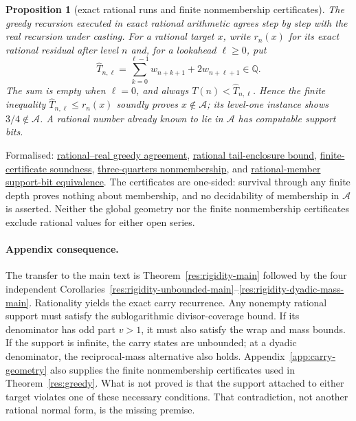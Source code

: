 \documentclass[11pt]{article}
\newcommand{\commit}{99f4bf47422abbd8757cbb22b50ba079d764d3a7}
\newcommand{\repobase}{https://github.com/wcook04/plectis-erdos/blob/\commit}
\newcommand{\PK}{Erdos249257}
\newcommand{\lword}[4]{\href{\repobase/\PK/#1\#L#2}{#4}}
\newtheorem{proposition}[theorem]{Proposition}
\theoremstyle{definition}
\theoremstyle{remark}
\newcommand{\Q}{\mathbb{Q}}
\begin{document}
\begin{proposition}[exact rational runs and finite nonmembership certificates]\label{res:death}
The greedy recursion executed in exact rational arithmetic agrees step by step
with the real recursion under casting. For a rational target $x$, write
$r_n(x)$ for its exact rational residual after level $n$ and, for a lookahead
$\ell\ge0$, put
\[
\widehat T_{n,\ell}
  =\sum_{k=0}^{\ell-1}w_{n+k+1}+2w_{n+\ell+1}\in\Q .
\]
The sum is empty when $\ell=0$, and always
$T(n)<\widehat T_{n,\ell}$. Hence the finite inequality
$\widehat T_{n,\ell}\le r_n(x)$ soundly proves $x\notin\mathcal A$; its
level-one instance shows $3/4\notin\mathcal A$. A rational number already
known to lie in $\mathcal A$ has computable support bits.
\end{proposition}
\noindent Formalised:
\lword{GreedyAchievementSet.lean}{1143}{cast_greedyMersenneRemainderRat}{rational--real greedy agreement},
\lword{GreedyAchievementSet.lean}{1728}{mersenneTail_lt_cast_tailUpperRat}{rational tail-enclosure bound},
\lword{GreedyAchievementSet.lean}{1762}{certifiedGreedyMersenneDeath_not_mem}{finite-certificate soundness},
\lword{GreedyAchievementSet.lean}{1784}{three_fourths_not_mem_mersenneAchievementSet}{three-quarters nonmembership},
and \lword{GreedyAchievementSet.lean}{1868}{rational_member_support_bit_iff}{rational-member support-bit equivalence}.
The certificates are one-sided: survival through any finite depth proves
nothing about membership, and no decidability of membership in $\mathcal A$ is
asserted.  Neither the global geometry nor the finite nonmembership certificates
exclude rational values for either open series.

\paragraph{Appendix consequence.}
The transfer to the main text is Theorem~\ref{res:rigidity-main} followed by
the four independent
Corollaries~\ref{res:rigidity-unbounded-main}--\ref{res:rigidity-dyadic-mass-main}.
Rationality yields the exact carry recurrence.  Any nonempty rational support
must satisfy the sublogarithmic divisor-coverage bound.  If its denominator
has odd part \(v>1\), it must also satisfy the wrap and mass bounds.  If the
support is infinite, the carry states are unbounded; at a dyadic denominator,
the reciprocal-mass alternative also holds.
Appendix~\ref{app:carry-geometry} also supplies the finite nonmembership certificates
used in Theorem~\ref{res:greedy}.  What is not proved is that the support attached to
either target violates one of these necessary conditions.  That
contradiction, not another rational normal form, is the missing premise.
\end{document}
